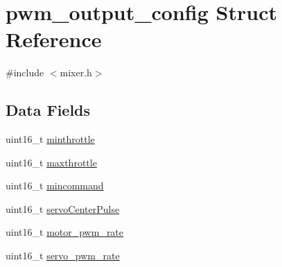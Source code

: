 \hypertarget{structpwm__output__config}{\section{pwm\+\_\+output\+\_\+config Struct Reference}
\label{structpwm__output__config}
}


{\ttfamily \#include $<$mixer.\+h$>$}

\subsection*{Data Fields}
\begin{DoxyCompactItemize}
\item 
uint16\+\_\+t \hyperlink{structpwm__output__config_a9c94e4bf433e5c48e8297ad30355d5fd}{minthrottle}
\item 
uint16\+\_\+t \hyperlink{structpwm__output__config_a2f58b9ab1046db9a4878377054fed2d6}{maxthrottle}
\item 
uint16\+\_\+t \hyperlink{structpwm__output__config_a19bd13cf35e997daff890073f7185bdc}{mincommand}
\item 
uint16\+\_\+t \hyperlink{structpwm__output__config_a00519b4e47c37267efae50d05459276d}{servo\+Center\+Pulse}
\item 
uint16\+\_\+t \hyperlink{structpwm__output__config_ad8a6b768442b35978897563dd144456b}{motor\+\_\+pwm\+\_\+rate}
\item 
uint16\+\_\+t \hyperlink{structpwm__output__config_a7d131c7364cdacf0d6e182b2a51ab20f}{servo\+\_\+pwm\+\_\+rate}
\end{DoxyCompactItemize}


